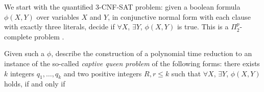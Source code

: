 \documentclass{article}
\newcommand{\existleveltwo}{\Sigma_2^p}
\theoremstyle{plain}
\theoremstyle{definition}
\newtheorem{problem}[theorem]{Problem}
\begin{document}
\begin{appendices}



We start with the quantified 3-CNF-SAT problem: given a boolean formula $\phi(X,Y)$ over variables $X$ and $Y$, in conjunctive normal form with each clause with exactly three literals, decide if $\forall X$, $\exists Y$, $\phi(X,Y)$ is true. This is a $\Pi_2^p$-complete problem \cite[Example 5.9]{arora2009computational}. 

Given such a $\phi$, \cite[Lemma 3.3 and Lemma 3.4]{eggermont2012motion} describe the construction of a polynomial time reduction to an instance of the so-called \emph{captive queen problem} \cite{eggermont2012motion} of the following forms: there exists $k$ integers $q_1, \ldots, q_k$ and two positive integers $R, r \leq k$ such that $\forall X$, $\exists Y$, $\phi(X,Y)$ holds, if and only if


\end{appendices}
\end{document}
